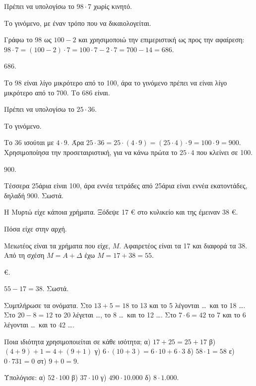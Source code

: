 
\tixero Πρέπει να υπολογίσω το $98\cdot 7$ χωρίς κινητό.\par
\tithelo Το γινόμενο, με έναν τρόπο που να δικαιολογείται.\par
\possindeo Γράφω το 98 ως $100-2$ και χρησιμοποιώ την επιμεριστική ως προς την αφαίρεση: $98\cdot 7=(100-2)\cdot 7=100\cdot 7-2\cdot 7=700-14=686$.\par
\apantisi $686$.\par
\elegxos Το 98 είναι λίγο μικρότερο από το 100, άρα το γινόμενο πρέπει να είναι λίγο μικρότερο από το 700. Το 686 είναι.

\tixero Πρέπει να υπολογίσω το $25\cdot 36$.\par
\tithelo Το γινόμενο.\par
\possindeo Το 36 ισούται με $4\cdot 9$. Άρα $25\cdot 36=25\cdot(4\cdot 9)=(25\cdot 4)\cdot 9=100\cdot 9=900$. Χρησιμοποίησα την προσεταιριστική, για να κάνω πρώτα το $25\cdot 4$ που κλείνει σε 100.\par
\apantisi $900$.\par
\elegxos Τέσσερα 25άρια είναι 100, άρα εννέα τετράδες από 25άρια είναι εννέα εκατοντάδες, δηλαδή 900. Σωστά.

\tixero Η Μυρτώ είχε κάποια χρήματα. Ξόδεψε 17 € στο κυλικείο και της έμειναν 38 €.\par
\tithelo Πόσα είχε στην αρχή.\par
\possindeo Μειωτέος είναι τα χρήματα που είχε, $Μ$. Αφαιρετέος είναι τα 17 και διαφορά τα 38. Από τη σχέση $Μ=Α+\Delta$ έχω $Μ=17+38=55$.\par
{} €.\par
\elegxos $55-17=38$. Σωστά.



\ex Συμπλήρωσε τα ονόματα. Στο $13+5=18$ το 13 και το 5 λέγονται \dots\ και το 18 \dots. Στο $20-8=12$ το 20 λέγεται \dots, το 8 \dots\ και το 12 \dots. Στο $7\cdot 6=42$ το 7 και το 6 λέγονται \dots\ και το 42 \dots.

\ex Ποια ιδιότητα χρησιμοποιείται σε κάθε ισότητα; α) $17+25=25+17$ \quad β) $(4+9)+1=4+(9+1)$ \quad γ) $6\cdot(10+3)=6\cdot 10+6\cdot 3$ \quad δ) $58\cdot 1=58$ \quad ε) $0\cdot 731=0$ \quad στ) $9+0=9$.

\ex Υπολόγισε: α) $52\cdot 100$ \quad β) $37\cdot 10$ \quad γ) $490\cdot 10.000$ \quad δ) $8\cdot 1.000$.

